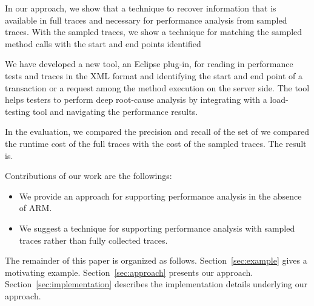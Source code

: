 In our approach, we show that a technique to recover information that is available in full traces and necessary for performance analysis from sampled traces. 
With the sampled traces, we show a technique for matching the sampled method calls with the start and end points identified

We have developed a new tool, an Eclipse plug-in, for reading in performance tests and traces in the XML format and identifying the start and end point of a transaction or a request among the method execution on the server side. The tool helps testers to perform deep root-cause analysis by integrating with a load-testing tool and navigating the performance results.

In the evaluation, we compared the precision and recall of the set of we compared the runtime cost of the full traces with the cost of the sampled traces. {The result is.}


Contributions of our work are the followings:
\begin{itemize}
\item We provide an approach for supporting performance analysis in the absence of ARM. \vspace*{-1ex}
\item We suggest a technique for supporting performance analysis with sampled traces rather than fully collected traces.\vspace*{-1ex}
\end{itemize}

The remainder of this paper is organized as follows.
Section~\ref{sec:example} gives a motivating example.
Section~\ref{sec:approach} presents our approach.
Section~\ref{sec:implementation} describes the implementation details underlying our approach.

